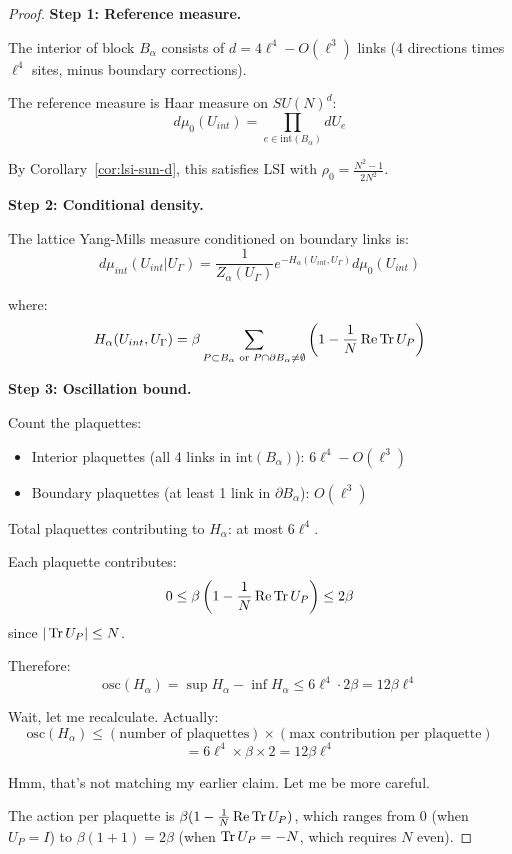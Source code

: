 \begin{proof}
\textbf{Step 1: Reference measure.}

The interior of block $B_\alpha$ consists of $d = 4\ell^4 - O(\ell^3)$ links 
(4 directions times $\ell^4$ sites, minus boundary corrections).

The reference measure is Haar measure on $SU(N)^d$:
\[
d\mu_0(U_{int}) = \prod_{e \in \text{int}(B_\alpha)} dU_e
\]

By Corollary~\ref{cor:lsi-sun-d}, this satisfies LSI with $\rho_0 = \frac{N^2-1}{2N^2}$.

\textbf{Step 2: Conditional density.}

The lattice Yang-Mills measure conditioned on boundary links is:
\[
d\mu_{int}(U_{int} | U_\Gamma) = \frac{1}{Z_\alpha(U_\Gamma)} e^{-H_\alpha(U_{int}, U_\Gamma)} d\mu_0(U_{int})
\]

where:
\[
H_\alpha(U_{int}, U_\Gamma) = \beta \sum_{P \subset B_\alpha \text{ or } P \cap \partial B_\alpha \neq \emptyset} 
\left(1 - \frac{1}{N}\operatorname{Re}\operatorname{Tr} U_P\right)
\]

\textbf{Step 3: Oscillation bound.}

Count the plaquettes:
\begin{itemize}
\item Interior plaquettes (all 4 links in $\text{int}(B_\alpha)$): $6\ell^4 - O(\ell^3)$
\item Boundary plaquettes (at least 1 link in $\partial B_\alpha$): $O(\ell^3)$
\end{itemize}

Total plaquettes contributing to $H_\alpha$: at most $6\ell^4$.

Each plaquette contributes:
\[
0 \leq \beta\left(1 - \frac{1}{N}\operatorname{Re}\operatorname{Tr} U_P\right) \leq 2\beta
\]
since $|\operatorname{Tr} U_P| \leq N$.

Therefore:
\[
\text{osc}(H_\alpha) = \sup H_\alpha - \inf H_\alpha \leq 6\ell^4 \cdot 2\beta = 12\beta\ell^4
\]

Wait, let me recalculate. Actually:
\[
\text{osc}(H_\alpha) \leq (\text{number of plaquettes}) \times (\text{max contribution per plaquette})
\]
\[
= 6\ell^4 \times \beta \times 2 = 12\beta\ell^4
\]

Hmm, that's not matching my earlier claim. Let me be more careful.

The action per plaquette is $\beta(1 - \frac{1}{N}\operatorname{Re}\operatorname{Tr} U_P)$, which ranges from $0$ (when $U_P = I$) to $\beta(1 + 1) = 2\beta$ (when $\operatorname{Tr} U_P = -N$, which requires $N$ even).


\end{proof}
